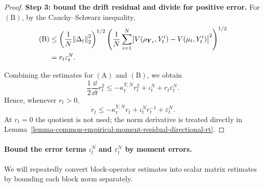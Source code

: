 \begin{proof}
\par\noindent\textbf{Step 3: bound the drift residual and divide for positive error.}
For \(\mathrm{(B)}\), by the Cauchy--Schwarz inequality,
\begin{align}
    \mathrm{(B)}
    &\le
    \left(
        \frac{1}{N}\norm{\Delta_t}_2^2
    \right)^{1/2}
    \left(
        \frac{1}{N}
        \sum_{i=1}^N
        \bigl|
            V(\rho_{\boldsymbol{Y}_t},Y_t^i)-V(\mu_t,Y_t^i)
        \bigr|^2
    \right)^{1/2} \\
    &=
    r_t\varepsilon_t^N.
\end{align}

Combining the estimates for \(\mathrm{(A)}\) and \(\mathrm{(B)}\), we obtain
\begin{equation}
    \frac{1}{2}\frac{\dd}{\dd t}r_t^2
    \le
    -\kappa_t^{Y,N} r_t^2 
    + \iota_t^N
    + r_t\varepsilon_t^N.
\end{equation}
Hence, whenever \(r_t>0\),
\begin{equation}
    \dot r_t
    \le
    -\kappa_t^{Y,N} r_t 
    + \iota_t^N r_t^{-1}
    + \varepsilon_t^N.
\end{equation}
At $r_t=0$ the quotient is not used; the norm derivative is treated directly in Lemma~\ref{lemma-common-empirical-moment-residual-directional-rt}.
\end{proof}

\paragraph{Bound the error terms $\iota_t^N$ and $\varepsilon_t^N$ by moment errors.}

We will repeatedly convert block-operator estimates into scalar matrix estimates by bounding each block norm separately.


